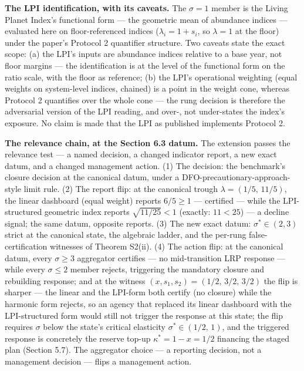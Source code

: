 \documentclass[3p,11pt]{elsarticle}
\begin{document}
\textbf{The LPI identification, with its caveats.} The \(\sigma = 1\)
member is the Living Planet Index's functional form --- the geometric mean
of abundance indices --- evaluated here on floor-referenced indices
(\(\lambda_i = 1 + s_i\), so \(\lambda = 1\) at the floor) under the
paper's Protocol 2 quantifier structure. Two caveats state the exact
scope: (a) the LPI's inputs are abundance indices relative to a base
year, not floor margins --- the identification is at the level of the
functional form on the ratio scale, with the floor as reference; (b) the
LPI's operational weighting (equal weights on system-level indices,
chained) is a point in the weight cone, whereas Protocol 2 quantifies
over the whole cone --- the rung decision is therefore the adversarial
version of the LPI reading, and over-, not under-states the index's
exposure. No claim is made that the LPI as published implements Protocol
2.

\textbf{The relevance chain, at the Section 6.3 datum.} The extension
passes the relevance test --- a named decision, a changed indicator
report, a new exact datum, and a changed management action. (1) The
decision: the benchmark's closure decision at the canonical datum, under
a DFO-precautionary-approach-style limit rule. (2) The report flip: at
the canonical trough \(\lambda = (1/5,\, 11/5)\), the linear dashboard
(equal weight) reports \(6/5 \ge 1\) --- certified --- while the
LPI-structured geometric index reports \(\sqrt{11/25} < 1\) (exactly:
\(11 < 25\)) --- a decline signal; the same datum, opposite reports.
(3) The new exact datum: \(\sigma^* \in (2, 3)\) strict at the
canonical state, the algebraic ladder, and the per-rung
false-certification witnesses of Theorem S2(ii). (4) The action flip: at
the canonical datum, every \(\sigma \ge 3\) aggregator certifies --- no
mid-transition LRP response --- while every \(\sigma \le 2\) member
rejects, triggering the mandatory closure and rebuilding response; and at
the witness \((x, s_1, s_2) = (1/2,\, 3/2,\, 3/2)\) the flip is
sharper --- the linear and the LPI-form both certify (no closure) while
the harmonic form rejects, so an agency that replaced its linear
dashboard with the LPI-structured form would still not trigger the
response at this state; the flip requires \(\sigma\) below the state's
critical elasticity \(\sigma^* \in (1/2,\, 1)\), and the triggered
response is concretely the reserve top-up \(\kappa^* = 1 - x = 1/2\)
financing the staged plan (Section 5.7). The aggregator choice --- a
reporting decision, not a management decision --- flips a management
action.
\end{document}
